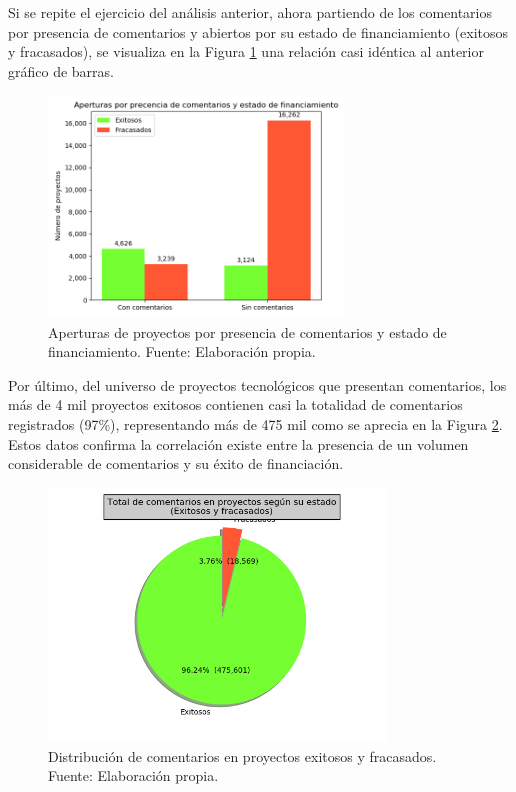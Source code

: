 Si se repite el ejercicio del análisis anterior, ahora partiendo de los comentarios por presencia de comentarios y abiertos por su estado de financiamiento (exitosos y fracasados), se visualiza en la Figura \ref{4:fig26} una relación casi idéntica al anterior gráfico de barras.

\begin{figure}[!ht]
	\begin{center}
		\includegraphics[width=0.7\textwidth]{4/figures/projects comment by state.png}
		\caption{Aperturas de proyectos por presencia de comentarios y estado de financiamiento. Fuente: Elaboración propia.}
		\label{4:fig26}
	\end{center}
\end{figure}

Por último, del universo de proyectos tecnológicos que presentan comentarios, los más de 4 mil proyectos exitosos contienen casi la totalidad de comentarios registrados (97\%), representando más de 475 mil como se aprecia en la Figura \ref{4:fig27}. Estos datos confirma la correlación existe entre la presencia de un volumen considerable de comentarios y su éxito de financiación.

\begin{figure}[!ht]
	\begin{center}
		\includegraphics[width=0.8\textwidth]{4/figures/total comments by projects state.png}
		\caption{Distribución de comentarios en proyectos exitosos y fracasados. Fuente: Elaboración propia.}
		\label{4:fig27}
	\end{center}
\end{figure}

